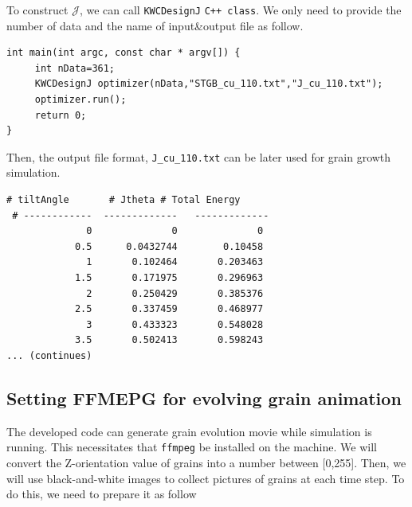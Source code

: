 \documentclass[11pt]{article}
\begin{document}
To construct $\mathcal{J}$, we can call \texttt{KWCDesignJ} \texttt{C++ class}.
We only need to provide the number of data and the name of input\&output file as follow.\\

\begin{tcolorbox}
\begin{lstlisting}[basicstyle=\footnotesize]
int main(int argc, const char * argv[]) {
     int nData=361;
     KWCDesignJ optimizer(nData,"STGB_cu_110.txt","J_cu_110.txt");
     optimizer.run(); 
     return 0;
}
\end{lstlisting}
\end{tcolorbox}


Then, the output file format, \texttt{J\_cu\_110.txt} can be later used for grain growth simulation.\\
\begin{tcolorbox}[colback=white]
\begin{lstlisting}[basicstyle=\footnotesize]
    # tiltAngle       # Jtheta # Total Energy
 # ------------  -------------   -------------
              0              0              0
            0.5      0.0432744        0.10458
              1       0.102464       0.203463
            1.5       0.171975       0.296963
              2       0.250429       0.385376
            2.5       0.337459       0.468977
              3       0.433323       0.548028
            3.5       0.502413       0.598243
... (continues)
\end{lstlisting}
\end{tcolorbox}

\subsection{Setting FFMEPG for evolving grain animation}


The developed code can generate grain evolution movie while simulation is running.
This necessitates that \texttt{ffmpeg} be installed on the machine. 
We will convert the Z-orientation value of grains into a number between 
[0,255]. Then, we will use black-and-white images to collect pictures of grains 
at each time step. 
To do this, we need to prepare it as follow 
\\
\end{document}
